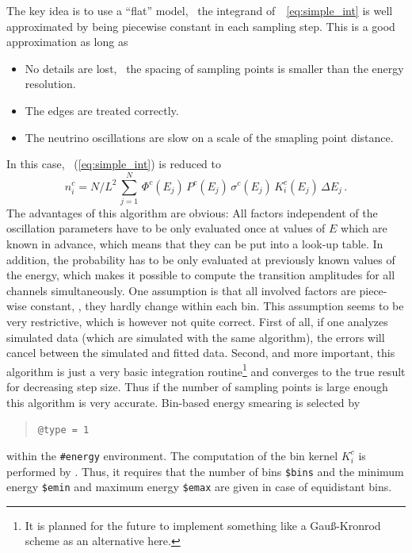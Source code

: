 The key idea is to use a ``flat'' model, \ie\ the integrand 
of~\eq~\ref{eq:simple_int}  is well approximated by being piecewise
constant in each sampling step. This is a good approximation as long as
\begin{itemize}
\item
 No details are lost, \ie\ the spacing of sampling points 
is smaller than the energy resolution.
\item
The edges are treated correctly.
\item
 The neutrino oscillations are slow on a scale of the smapling point distance.
\end{itemize}
In this case, \eq~(\ref{eq:simple_int}) is reduced to
\begin{equation}
\label{eq:algo_one}
n_i^c=N/L^2 \, \sum_{j=1}^N \,  \Phi^c(E_j)\,
P^c(E_j)\,
\sigma^c(E_j)\,
K_i^c(E_j) \, \Delta E_j \,.
\end{equation}
The advantages of this algorithm are obvious: All factors
independent of the oscillation parameters have to be only evaluated once
at values of $E$ which are known in advance, which means that they can be put 
into a look-up table. In addition, the probability
has to be only evaluated at previously known values of the energy, which
makes it possible to compute the transition amplitudes for all channels
simultaneously. One assumption is that all involved factors are piece-wise
constant, \ie, they hardly change within each bin. This 
assumption seems to be very restrictive, which is however not quite correct.
First of all, if one analyzes simulated data (which are simulated with the same algorithm), the errors
will cancel between the simulated and fitted data. Second, and more important,
this algorithm is just a very basic integration routine\footnote{It is planned 
for the future to implement something like a Gau\ss-Kronrod scheme as an
alternative here.} and converges to the true result for decreasing step size.
Thus if the number of sampling points is large enough this algorithm is very
accurate. Bin-based energy smearing is selected by
%
%
\begin{quote}
{\tt \tb @type = 1}
\end{quote}
within the {\tt \#energy} environment.
The computation of the bin kernel $K_i^c$ is performed
by \GLOBES. Thus, it requires that the number of bins
{\tt \$bins} and the minimum energy {\tt \$emin} and maximum energy {\tt \$emax} are given in case of equidistant bins.
%
